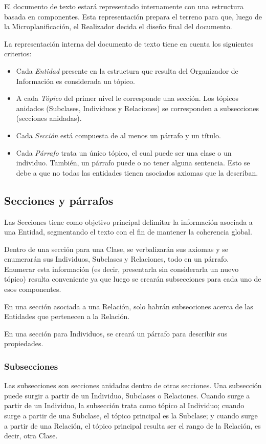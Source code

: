 El documento de texto estará representado internamente con una estructura basada en componentes. Esta representación prepara el terreno para que, luego de la Microplanificación, el Realizador decida el diseño final del documento.

La representación interna del documento de texto tiene en cuenta los siguientes criterios:
\begin{itemize}
    \item Cada\textit{ Entidad} presente en la estructura que resulta del Organizador de Información es considerada un tópico. 
    \item A cada\textit{ Tópico} del primer nivel le corresponde una sección. Los tópicos anidados (Subclases, Individuos y Relaciones) se corresponden a subsecciones (secciones anidadas).
    \item Cada \textit{Sección} está compuesta de al menos un párrafo y un título.
    \item Cada \textit{Párrafo} trata un único tópico, el cual puede ser una clase o un individuo. También, un párrafo puede o no tener alguna sentencia. Esto se debe a que no todas las entidades tienen asociados axiomas que la describan.
\end{itemize}

\subsection{Secciones y párrafos}
Las Secciones tiene como objetivo principal delimitar la información asociada a una Entidad, segmentando el texto con el fin de mantener la coherencia global.

Dentro de una sección para una Clase, se verbalizarán sus axiomas y se enumerarán sus Individuos, Subclases y Relaciones, todo en un párrafo. Enumerar esta información (es decir, presentarla sin considerarla un nuevo tópico) resulta conveniente ya que luego se crearán subsecciones para cada uno de esos componentes.

En una sección asociada a una Relación, solo habrán subsecciones acerca de las Entidades que pertenecen a la Relación.

En una sección para Individuos, se creará un párrafo para describir sus propiedades.

\subsubsection{Subsecciones}
Las subsecciones son secciones anidadas dentro de otras secciones. Una subsección puede surgir a partir de un Individuo, Subclases o Relaciones. Cuando surge a partir de un Individuo, la subsección trata como tópico al Individuo; cuando surge a partir de una Subclase, el tópico principal es la Subclase; y cuando surge a partir de una Relación, el tópico principal resulta ser el rango de la Relación, es decir, otra Clase.

